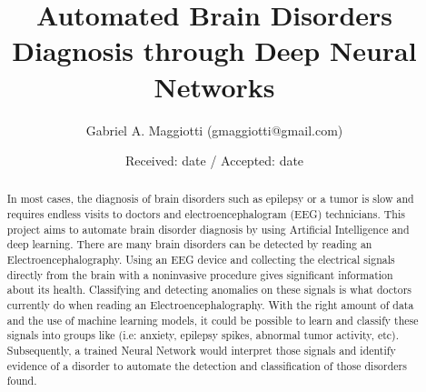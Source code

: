 \documentclass{llncs}       %
\begin{document}
\title{Automated Brain Disorders Diagnosis through Deep Neural Networks%
}


\author{Gabriel A. Maggiotti (gmaggiotti@gmail.com)
}



\date{Received: date / Accepted: date}


\maketitle


\begin{abstract}
In most cases, the diagnosis of brain disorders such as epilepsy or a tumor is slow and requires endless visits to doctors and electroencephalogram (EEG) technicians. This project aims to automate brain disorder diagnosis by using Artificial Intelligence and deep learning. There are many brain disorders  can be detected by reading an Electroencephalography. Using an EEG device and collecting the electrical signals directly from the brain with a noninvasive procedure gives significant information about its health. Classifying and detecting anomalies on these signals is what doctors currently do when reading an Electroencephalography. With the right amount of data and the use of machine learning models, it could be possible to learn and classify these signals into groups like (i.e: anxiety, epilepsy spikes, abnormal tumor activity, etc). Subsequently, a trained Neural Network would interpret those signals and identify evidence of a disorder to automate the detection and classification of those disorders found. 

\end{abstract}


\paragraph{}\paragraph{}
\end{document}
